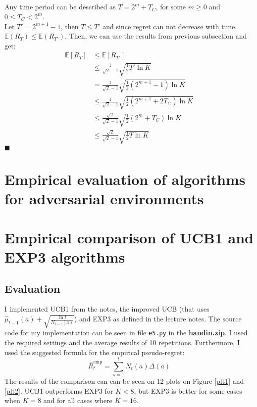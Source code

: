 \documentclass[a4paper]{article}
\newcommand{\expect}[1]{\mathbb{E}\left(#1\right)}
\newcommand*{\QEDA}{\hfill\ensuremath{\blacksquare}}%
\begin{document}
\subsection{}
\label{subsec:32}
Any time period can be described as $T = 2^m + T_C$, for some $m\geq0$ and
$0 \leq T_C < 2^m$. \\
Let $T' = 2^{m+1}-1$, then $T \leq T'$ and since regret can not decrease with time,
$\expect{R_T} \leq \expect{R_{T'}}$.
Then, we can use the results from previous subsection and get:
\begin{align*}
  \mathbb{E}\left[R_{T}\right]&\leq \mathbb{E}\left[R_{T'}\right]\\
  &\leq\frac{1}{\sqrt{2}-1} \sqrt{\frac{1}{2} T' \ln K}\\
  &= \frac{1}{\sqrt{2}-1} \sqrt{\frac{1}{2} (2^{m+1}-1) \ln K}\\
  &\leq\frac{1}{\sqrt{2}-1} \sqrt{\frac{1}{2} (2^{m+1}+2T_C) \ln K} \tag{since $T_C \geq0$}\\
  &\leq\frac{\sqrt{2}}{\sqrt{2}-1} \sqrt{\frac{1}{2} (2^m+T_C) \ln K}\\
  &\leq\frac{\sqrt{2}}{\sqrt{2}-1} \sqrt{\frac{1}{2} T \ln K}
\end{align*}
\QEDA


\section{Empirical evaluation of algorithms for adversarial environments}
\label{sec:4}


\section{Empirical comparison of UCB1 and EXP3 algorithms}
\label{sec:5}
\subsection{Evaluation}
I implemented UCB1 from the notes, the improved UCB (that uses
$\hat{\mu}_{t-1}(a)+\sqrt{\frac{\ln t}{N_{t-1}(a)}}$) and EXP3 as defined in the
lecture notes. The source code for my implementation can be seen in file
\texttt{e5.py} in the \textbf{handin.zip}. I used the required settings and the
average results of 10 repetitions. Furthermore, I used the suggested formula for
the empirical pseudo-regret:
\[
\bar{R}_{t}^{\mathrm{emp}}=\sum_{s=1}^{t} N_{t}(a) \Delta(a)
\]
The results of the comparison can can be seen on 12 plots on Figure \ref{plt1} and \ref{plt2}.
UCB1 outperforms EXP3 for $K<8$, but EXP3 is better for some cases
when $K=8$ and for all cases where $K=16$.
\end{document}
